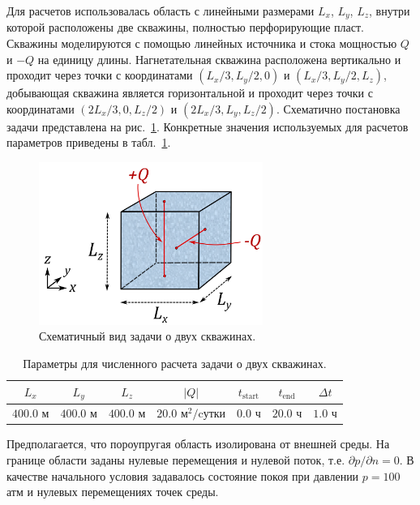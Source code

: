 Для расчетов использовалась область с линейными размерами $L_x$, $L_y$, $L_z$,
внутри которой расположены две скважины, полностью перфорирующие пласт. 
Скважины моделируются с помощью линейных источника и стока мощностью
$Q$ и $-Q$ на единицу длины. Нагнетательная скважина расположена вертикально и
проходит через точки с координатами $(L_x/3, L_y/2, 0)$ и $(L_x/3, L_y/2, L_z)$,
добывающая скважина является горизонтальной и проходит через точки
с координатами $(2L_x/3, 0, L_z/2)$ и $(2L_x/3, L_y, L_z/2)$.
Схематично постановка задачи представлена на рис.~\ref{fig:2wells}.
Конкретные значения используемых для расчетов параметров приведены в табл.~\ref{tab:2wells}.
%
\begin{figure}[h!]
\centering
\includegraphics[width=0.65\textwidth]{./figs/2wells.png}
\caption{Схематичный вид задачи о двух скважинах.}\label{fig:2wells}
\end{figure}
% 

\begin{table}[h!]
\centering
%
\renewcommand{\arraystretch}{1.5}
\renewcommand{\tabcolsep}{6 pt} 
\begin{tabular}{|c|c|c|c|c|c|c|}
\hline
$L_x$ & $L_y$ & $L_z$ & $|Q|$ & $t_{\text{start}}$ & $t_{\text{end}}$ & $\Delta t$\\
\hline
 $400.0$ м & $400.0$ м & $400.0$ м & $20.0 \text{ м}^2/\text{cутки}$ & $0.0$ ч & $20.0$ ч & $1.0$ ч\\
\hline
\end{tabular}
%
\caption{Параметры для численного расчета задачи о двух скважинах.}\label{tab:2wells}
\end{table}
%

Предполагается, что пороупругая область изолирована от внешней среды.
На границе области заданы нулевые перемещения и нулевой поток, т.е. 
$\partial p/ \partial n = 0$. В качестве начального условия задавалось состояние покоя
при давлении $p = 100$ атм и нулевых перемещениях точек среды.

